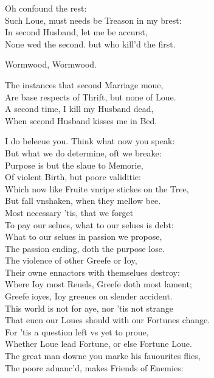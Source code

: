 \documentclass[a5paper,DIV=calc,11pt]{scrbook}
\begin{document}
\begin{drama*}
    \playqueen Oh confound the rest:\\
    Such Loue, must needs be Treason in my brest:\\
    In second Husband, let me be accurst,\\
    None wed the second. but who kill'd the first.
    
    \hamspeaks Wormwood, Wormwood.
    
    \playqueen The instances that second Marriage moue,\\
    Are base respects of Thrift, but none of Loue.\\
    A second time, I kill my Husband dead,\\
    When second Husband kisses me in Bed.
    
    \playking I do beleeue you. Think what now you speak:\\
    But what we do determine, oft we breake:\\
    Purpose is but the slaue to Memorie,\\
    Of violent Birth, but poore validitie:\\
    Which now like Fruite vnripe stickes on the Tree,\\
    But fall vnshaken, when they mellow bee.\\
    Most necessary 'tis, that we forget\\
    To pay our selues, what to our selues is debt:\\
    What to our selues in passion we propose,\\
    The passion ending, doth the purpose lose.\\
    The violence of other Greefe or Ioy,\\
    Their owne ennactors with themselues destroy:\\
    Where Ioy most Reuels, Greefe doth most lament;\\
    Greefe ioyes, Ioy greeues on slender accident.\\
    This world is not for aye, nor 'tis not strange\\
    That euen our Loues should with our Fortunes change.\\
    For 'tis a question left vs yet to proue,\\
    Whether Loue lead Fortune, or else Fortune Loue.\\
    The great man downe you marke his fauourites flies,\\
    The poore aduanc'd, makes Friends of Enemies:\\

\end{drama*}
\end{document}
